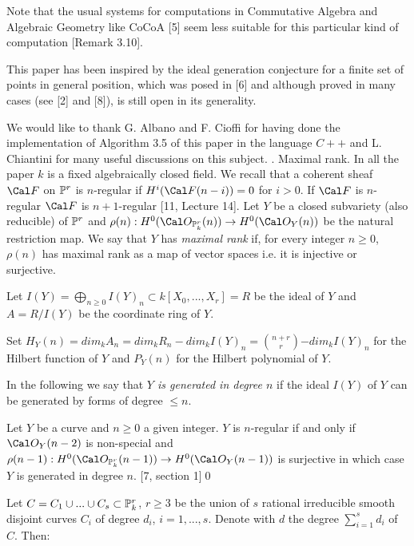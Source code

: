 Note that the usual systems for computations in Commutative Algebra and 
Algebraic Geometry like CoCoA [5] seem less suitable for this
particular kind of computation [Remark 3.10].

This paper has been inspired by the ideal generation conjecture for a
finite set of points 
in general position, which was posed in [6] and 
although proved in many cases (see [2] and [8]), is still
open in its generality.

We would like to thank G. Albano and F. Cioffi for having done the
implementation 
of  Algorithm 3.5 of this paper in the language $C++$ and L. Chiantini for
many
useful discussions on this subject.
. Maximal rank.\endhead
In all the paper $k$ is a fixed algebraically closed field.\medskip
We recall that a coherent sheaf $\Cal F$ on $\Bbb P^r$ is  $n$-regular if
$H^i(\Cal F(n-i))=0$ for $i>0$. If $\Cal F$ is $n$-regular $\Cal F$ is
$n+1$-regular [11, Lecture 14].
 Let $Y$ be a closed subvariety (also
reducible)
 of $\Bbb P^r$ and
$\rho(n): H^0(\Cal O_{\Bbb P^r_k}(n)) \to H^0(\Cal O_Y(n))$ be
the natural restriction map. We say that $Y$ has {\sl maximal rank} if,
for every
integer $n\geq 0$, 
 $\rho(n)$ has maximal rank
as a map of vector spaces i.e. it is injective or
surjective.\enddefinition

Let $I(Y)=\bigoplus_{n\geq 0}I(Y)_n\subset k[X_0,...,X_r]=R$ be the ideal
of 
$Y$ and $A=R/I(Y)$ be the coordinate
ring of $Y$. 

Set $H_Y(n)=dim_kA_n=dim_kR_n-dim_kI(Y)_n= $$n+r\choose r$$-dim_kI(Y)_n$
for the Hilbert function of  $Y$ and $P_Y(n)$ for the Hilbert polynomial
of $Y$.
 
In the following we say that {\sl $Y$ is generated in degree $n$} if 
the ideal $I(Y)$ of $Y$ can be generated by forms of degree $\leq n$.

 Let $Y$ be a curve and $n\geq 0$ a given integer.
 $Y$ is $n$-regular if and only if $\Cal O_Y(n-2)$ is non-special and
$\rho(n-1): H^0(\Cal O_{\Bbb P^r_k}(n-1)) \to H^0(\Cal O_Y(n-1))$ is
surjective in which case
$Y$ is generated in degree $n$.\endproclaim
{} [7, section 1]\qed\enddemo

 



 Let
 $C=C_1\cup...\cup C_s\subset  \Bbb P^r_k$, $r\geq 3$ be the union 
of  $s$ rational irreducible smooth disjoint 
curves $C_i$ of degree $d_i$, $i=1,...,s$.
 Denote with $d$  the degree $\sum_{i=1}^s d_i$ of $C$. Then:\medskip
 

